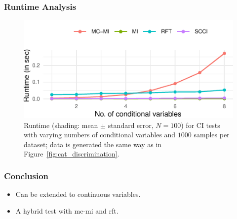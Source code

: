 \documentclass{beamer}
\begin{document}
\begin{frame}
	\frametitle{Runtime Analysis}
	\begin{figure}
		\centering
		\includegraphics{imgs/runtime.pdf}
		\caption{Runtime (shading: mean $\pm$ standard error, $N=100$)
		for CI tests with varying numbers of conditional variables and
		$1000$ samples per dataset; data is generated the same way as
		in Figure~\ref{fig:cat_discrimination}.}
	\end{figure}
\end{frame}

\begin{frame}
	\frametitle{Conclusion}
	\begin{itemize}
		\item Can be extended to continuous variables.
		\item A hybrid test with mc-mi and rft.
	\end{itemize}
\end{frame}
\end{document}
